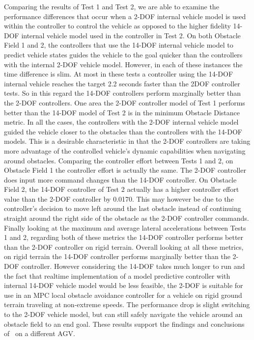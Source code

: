 \documentclass[12pt,twocolumn]{article}
\newcommand{\CHRONO}{{\sffamily{{Chrono}}}}
\begin{document}
Comparing the results of Test 1 and Test 2, we are able to examine the performance differences that occur when a 2-DOF internal vehicle model is used within the controller to control the {\CHRONO} vehicle as opposed to the higher fidelity 14-DOF internal vehicle model used in the controller in Test 2. On both Obstacle Field 1 and 2, the controllers that use the 14-DOF internal vehicle model to predict vehicle states guides the {\CHRONO} vehicle to the goal quicker than the controllers with the internal 2-DOF vehicle model. However, in each of these instances the time difference is slim. At most in these tests a controller using the 14-DOF internal vehicle reaches the target 2.2 seconds faster than the 2DOF controller tests. So in this regard the 14-DOF controllers perform marginally better than the 2-DOF controllers. One area the 2-DOF controller model of Test 1 performs better than the 14-DOF model of Test 2 is in the minimum Obstacle Distance metric. In all the cases, the controllers with the 2-DOF internal vehicle model guided the vehicle closer to the obstacles than the controllers with the 14-DOF models. This is a desirable characteristic in that the 2-DOF controllers are taking more advantage of the controlled vehicle's dynamic capabilities when navigating around obstacles. Comparing the controller effort between Tests 1 and 2, on Obstacle Field 1 the controller effort is actually the same. The 2-DOF controller does input more command changes than the 14-DOF controller. On Obstacle Field 2, the 14-DOF controller of Test 2 actually has a higher controller effort value than the 2-DOF controller by 0.0170. This may however be due to the controller's decision to move left around the last obstacle instead of continuing straight around the right side of the obstacle as the 2-DOF controller commands. Finally looking at the maximum and average lateral accelerations between Tests 1 and 2, regarding both of these metrics  the 14-DOF controller performs better than the 2-DOF controller on rigid terrain. Overall looking at all these metrics, on rigid terrain the 14-DOF controller performs marginally better than the 2-DOF controller. However considering the 14-DOF takes much longer to run and the fact that realtime implementation of a model predictive controller with internal 14-DOF vehicle model would be less feasible, the 2-DOF is suitable for use in an MPC local obstacle avoidance controller for a vehicle on rigid ground terrain traveling at non-extreme speeds. The performance drop is slight switching to the 2-DOF vehicle model, but can still safely navigate the vehicle around an obstacle field to an end goal. These results support the findings and conclusions of~\cite{ModelFidelity2016} on a different AGV. 
\end{document}
